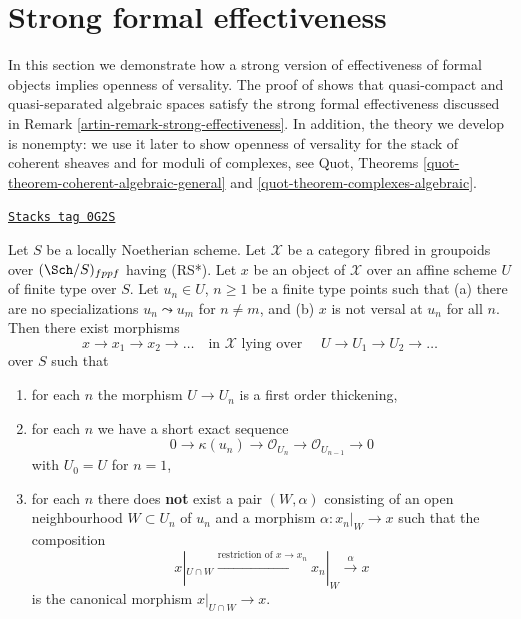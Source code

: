 \section{Strong formal effectiveness}
\label{artin-section-strong-formal-effectiveness}
In this section we demonstrate how a strong version of effectiveness
of formal objects implies openness of versality. The proof of
\cite[Theorem 1.1]{Bhatt-Algebraize} shows that quasi-compact and
quasi-separated algebraic spaces satisfy the strong formal effectiveness
discussed in Remark \ref{artin-remark-strong-effectiveness}. In addition, the
theory we develop is nonempty: we use it later to show openness of versality
for the stack of coherent sheaves and for moduli of complexes, see
Quot, Theorems
\ref{quot-theorem-coherent-algebraic-general} and
\ref{quot-theorem-complexes-algebraic}.

\begin{lemma}
\label{artin-lemma-infinite-sequence-pre}
\href{https://stacks.math.columbia.edu/tag/0G2S}{\texttt{Stacks tag 0G2S}}

Let $S$ be a locally Noetherian scheme. Let $\mathcal{X}$ be a category
fibred in groupoids over $(\Sch/S)_{fppf}$ having (RS*).
Let $x$ be an object of
$\mathcal{X}$ over an affine scheme $U$ of finite type over $S$.
Let $u_n \in U$, $n \geq 1$ be a finite type points such that
(a) there are no specializations $u_n \leadsto u_m$ for $n \not = m$, and
(b) $x$ is not versal at $u_n$ for all $n$. Then there exist morphisms
$$
x \to x_1 \to x_2 \to \ldots
\quad\text{in }\mathcal{X}\text{ lying over }\quad
U \to U_1 \to U_2 \to \ldots
$$
over $S$ such that
\begin{enumerate}
\item for each $n$ the morphism $U \to U_n$ is a first order
thickening,
\item for each $n$ we have a short exact sequence
$$
0 \to \kappa(u_n) \to \mathcal{O}_{U_n} \to \mathcal{O}_{U_{n - 1}} \to 0
$$
with $U_0 = U$ for $n = 1$,
\item for each $n$ there does {\bf not} exist a pair $(W, \alpha)$
consisting of an open neighbourhood $W \subset U_n$ of $u_n$
and a morphism $\alpha : x_n|_W \to x$
such that the composition
$$
x|_{U \cap W} \xrightarrow{\text{restriction of }x \to x_n}
x_n|_W \xrightarrow{\alpha} x
$$
is the canonical morphism $x|_{U \cap W} \to x$.
\end{enumerate}
\end{lemma}


